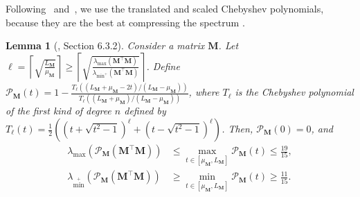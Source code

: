 \documentclass{article}
\newtheorem{lemma}{Lemma}
\DeclareMathOperator{\range}{\mathrm{range}}
\newcommand{\lmax}{\lambda_{\max}}
\newcommand{\lminp}{\lambda_{\min^+}}
\newcommand{\cL}{\mathcal{L}}
\newcommand{\cP}{\mathcal{P}}
\newcommand{\mB}{\mathbf{B}}
\newcommand{\mK}{\mathbf{K}}
\newcommand{\mW}{\mathbf{W}}
\newcommand{\pW}{\mathbf{W'}}
\newcommand{\mb}{\mathbf{b}}
\newcommand{\pb}{\mathbf{b'}}
\newcommand{\mM}{\mathbf{M}}
\newcommand{\cbraces}[1]{\left( #1 \right)}
\newcommand{\cbr}[1]{\left( #1 \right)}
\newcounter{annotatecount}
\newcounter{annotateidx}
\newcounter{annotatejdx}
\newcounter{annotatelabelcount}
\newcommand{\atran}[2]{\stepcounter{annotatecount}\overset{(\alph{annotatecount})}{#1}\csgdef{annotatedescription\theannotatecount}{#2}}
\newcommand{\alra}[1]{\atran{\Leftrightarrow}{#1}}
\newcommand{\annotateinitused}{\setcounter{annotateidx}{0}\whileboolexpr{test{\ifnumless{\theannotateidx}{\theannotatecount}}}{\stepcounter{annotateidx}\csgdef{aused\theannotateidx}{0}}}
\newcommand{\annotategetlabels}{\setcounter{annotatejdx}{0}\setcounter{annotatelabelcount}{0}\whileboolexpr{test{\ifnumless{\theannotatejdx}{\theannotatecount}}}{\stepcounter{annotatejdx}\ifcsequal{annotatedescription\theannotateidx}{annotatedescription\theannotatejdx}{\csgdef{aused\theannotatejdx}{1}\stepcounter{annotatelabelcount}\csedef{annotatelabel\theannotatelabelcount}{(\alph{annotatejdx})}}{}}}
\newcommand{\annotateprintlabels}{\setcounter{annotatejdx}{0}\whileboolexpr{test{\ifnumless{\theannotatejdx}{\theannotatelabelcount}}}{\stepcounter{annotatejdx}\ifnumequal{\theannotatejdx}{\theannotatelabelcount}{\ifnumequal{\theannotatejdx}{1}{}{~and~}}{}\csuse{annotatelabel\theannotatejdx}\ifnumless{\theannotatejdx}{\theannotatelabelcount}{\ifnumless{\theannotatejdx+1}{\theannotatelabelcount}{,~}{}}{}}}
\newcommand{\annotate}{\annotateinitused\setcounter{annotateidx}{0}\whileboolexpr{test{\ifnumless{\theannotateidx}{\theannotatecount}}}{\stepcounter{annotateidx}\ifcsstring{aused\theannotateidx}{0}{\ifnumequal{\theannotateidx}{1}{}{;~}\annotategetlabels\annotateprintlabels~\csuse{annotatedescription\theannotateidx}}{}}\setcounter{annotatecount}{0}}
\begin{document}
%

Following~\cite{salim2022optimal} and~\cite{scaman2017optimal}, we use the translated and scaled Chebyshev polynomials, because they are the best at compressing the spectrum \cite{auzinger2011iterative}.
 
\begin{lemma}[\cite{salim2022optimal}, Section 6.3.2]\label{lem:poly}
  Consider a matrix $\mM$.
  Let $\ell = \left\lceil\sqrt{\frac{L_\mM}{\mu_\mM}}\right\rceil \geq \left\lceil\sqrt{\frac{\lmax(\mM^\top\mM)}{\lminp(\mM^\top\mM)}}\right\rceil$.
  Define $\cP_{\mM}(t) = 1 - \frac{T_\ell\cbraces{(L_\mM + \mu_\mM - 2t) / (L_\mM - \mu_\mM)}}{T_\ell\cbraces{(L_\mM + \mu_\mM) / (L_\mM - \mu_\mM)}}$,
  where $T_\ell$ is the Chebyshev polynomial of the first kind of degree $n$ defined by $T_\ell(t) = \frac12 \cbraces{\cbr{t + \sqrt{t^2 - 1}}^\ell + \cbr{t - \sqrt{t^2 - 1}}^\ell }$.
  Then, $\cP_{\mM}(0) = 0$, and 
  \begin{align}
    \lmax\cbraces{\cP_{\mM}(\mM^\top\mM)} &\leq \max_{t \in [\mu_\mM, L_\mM]} \cP_{\mM}(t) \leq \frac{19}{15},
   \\
    \lminp\cbraces{\cP_{\mM}(\mM^\top\mM)} &\geq \min_{t \in [\mu_\mM, L_\mM]} \cP_{\mM}(t) \geq \frac{11}{15}.
  \end{align}
\end{lemma}
\end{document}
